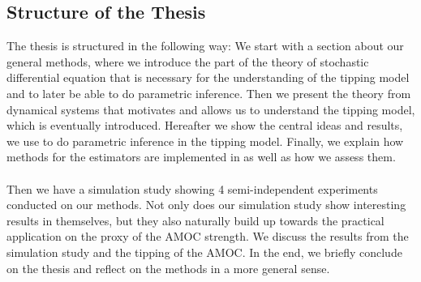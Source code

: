 \subsection{Structure of the Thesis}
The thesis is structured in the following way: We start with a section about our general methods, where we  introduce the part of the theory of stochastic differential equation that is necessary for the understanding of the tipping model and to later be able to do parametric inference. Then we present the theory from dynamical systems that motivates and allows us to understand the tipping model, which is eventually introduced. Hereafter we show the central ideas and results, we use to do parametric inference in the tipping model. Finally, we explain how methods for the estimators are implemented in  as well as how we assess them. \\\\
Then we have a simulation study showing 4 semi-independent experiments conducted on our methods. Not only does our simulation study show interesting results in themselves, but they also naturally build up towards the practical application on the proxy of the AMOC strength. We discuss the results from the simulation study and the tipping of the AMOC. In the end, we briefly conclude on the thesis and reflect on the methods in a more general sense. 
